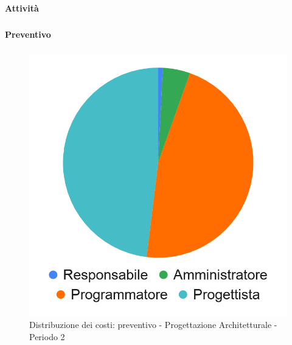 \paragraph{Attività}
\subparagraph*{}

\planningTable{
	
}

\paragraph{Preventivo}
\subparagraph*{}

\hspace{-1cm}
\begin{minipage}{.50\textwidth}
\smallPreventivoTable{
	
}
\end{minipage}
\hspace{1cm}
\begin{minipage}{.40\textwidth}
\begin{figure}[H]
	\includegraphics[scale=0.21]{res/images/charts/preventivo_priori/Grafico4-4.png}
	\caption{Distribuzione dei costi: preventivo - Progettazione Architetturale - Periodo 2}
\end{figure}
\end{minipage} 



